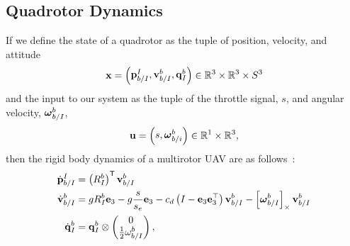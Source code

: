
\subsection{Quadrotor Dynamics}

If we define the state of a quadrotor as the tuple of position, velocity, and
attitude
\begin{equation*}
  \boldsymbol{\mathrm{x}} = \begin{pmatrix}\boldsymbol{\mathrm{p}}_{b/I}^{I}, \boldsymbol{\mathrm{v}}_{b/I}^b, \boldsymbol{\mathrm{q}}_I^{b}
        \end{pmatrix} \in \mathbb{R}^3 \times \mathbb{R}^3
        \times S^3
\end{equation*}
and the input to our system as the tuple of the throttle signal, $s$, and angular
velocity, $\boldsymbol{\mathrm{\omega}}_{b/I}^b$,
\begin{equation*}
	\boldsymbol{\mathrm{u}} = \begin{pmatrix}s, \boldsymbol{\mathrm{\omega}}_{b/i}^b \end{pmatrix} \in
        \mathbb{R}^1 \times \mathbb{R}^3,
\end{equation*}
then the rigid body dynamics of a multirotor UAV are as follows~\cite{leishman2014accel}:
\small
\begin{align}
		\dot{\boldsymbol{\mathrm{p}}}_{b/I}^{I} &= \left(R_{I}^{b}\right)^{\mathsf{T}} \boldsymbol{\mathrm{v}}_{b/I}^{b} \nonumber \\
		\dot{\boldsymbol{\mathrm{v}}}_{b/I}^{b} &= gR_I^b \boldsymbol{\mathrm{e}}_3 - g\frac{s}{s_e}\boldsymbol{\mathrm{e}}_3 -
                c_d \left( I - \boldsymbol{\mathrm{e}}_3 \boldsymbol{\mathrm{e}}_3^\top \right)
                \boldsymbol{\mathrm{v}}_{b/I}^b -
                \left[ \boldsymbol{\mathrm{\omega}}_{b/I}^b \right]_{\times}\boldsymbol{\mathrm{v}}_{b/I}^b
                \label{eq:dynamics} \\
                \dot{\boldsymbol{\mathrm{q}}}_{I}^{b} 
	&= 	
                \boldsymbol{\mathrm{q}}_I^b \otimes \begin{pmatrix} 0 \\ \frac{1}{2}
                \omega_{b/I}^b\end{pmatrix} \nonumber,
\end{align}
